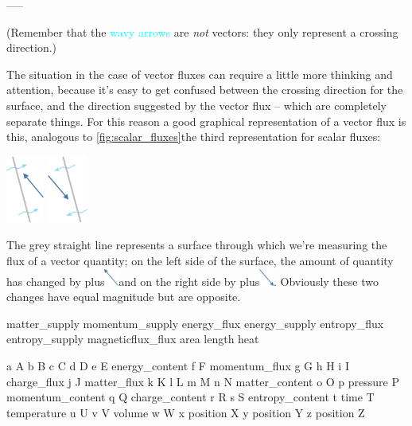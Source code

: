 -----

(Remember that the \textcolor{cyan}{wavy arrows} are \emph{not} vectors: they only represent a crossing direction.)

The situation in the case of vector fluxes can require a little more thinking and attention, because it's easy to get confused between the crossing direction for the surface, and the direction suggested by the vector flux -- which are completely separate things. For this reason a good graphical representation of a vector flux is this, analogous to \autoref{fig:scalar_fluxes}{the third representation for scalar fluxes}:\noprelistbreak
\begin{center}
\hspace*{\fill}
\includegraphics[height=6em]{images/flux_vec_right.pdf}%
\hfill
\includegraphics[height=6em]{images/flux_vec_left.pdf}%
\hspace*{\fill}
\end{center}
The \textcolor{midgrey}{grey straight line} represents a surface through which we're measuring the flux of a vector quantity; on the left side of the surface, the amount of quantity has changed by plus\enspace\includegraphics[align=c,height=1.5em]{images/vec_NW.pdf}\enspace and on the right side by plus\enspace\includegraphics[align=c,height=1.5em]{images/vec_SE.pdf}\:.
Obviously these two changes have equal magnitude but are opposite.




matter_supply
momentum_supply
energy_flux
energy_supply
entropy_flux
entropy_supply
magneticflux_flux
area
length
heat



a
A
b
B
c
C
d
D
e
E energy_content
f
F momentum_flux
g
G
h
H
i
I charge_flux
j
J matter_flux
k
K
l
L
m
M
n
N matter_content
o
O
p pressure
P momentum_content
q
Q charge_content
r
R
s
S entropy_content
t time
T temperature
u
U
v
V volume
w
W
x position
X
y position
Y
z position
Z


